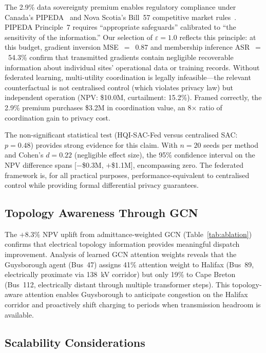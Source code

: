 \documentclass[journal]{IEEEtran}
\begin{document}
The 2.9\% data sovereignty premium enables regulatory compliance under
Canada's PIPEDA~\cite{pipeda2000} and Nova Scotia's Bill~57 competitive
market rules~\cite{nsbill57}. PIPEDA Principle~7 requires
``appropriate safeguards'' calibrated to ``the sensitivity of the
information.'' Our selection of $\varepsilon{=}1.0$ reflects this
principle: at this budget, gradient inversion MSE~$=$~0.87 and
membership inference ASR~$=$~54.3\% confirm that transmitted gradients
contain negligible recoverable information about individual sites'
operational data or training records. Without federated learning,
multi-utility coordination is legally infeasible---the relevant
counterfactual is not centralised control (which violates privacy law)
but independent operation (NPV: \$10.0M, curtailment: 15.2\%).
Framed correctly, the 2.9\% premium purchases \$3.2M in coordination
value, an 8$\times$ ratio of coordination gain to privacy cost.

The non-significant statistical test (HQI-SAC-Fed versus centralised
SAC: $p = 0.48$) provides strong evidence for this claim. With
$n = 20$ seeds per method and Cohen's $d = 0.22$ (negligible effect
size), the 95\% confidence interval on the NPV difference spans
[$-$\$0.3M, $+$\$1.1M], encompassing zero. The federated framework
is, for all practical purposes, performance-equivalent to centralised
control while providing formal differential privacy guarantees.

\subsection{Topology Awareness Through GCN}

The $+8.3\%$ NPV uplift from admittance-weighted GCN
(Table~\ref{tab:ablation}) confirms that electrical topology
information provides meaningful dispatch improvement. Analysis of
learned GCN attention weights reveals that the Guysborough agent
(Bus~47) assigns 41\% attention weight to Halifax (Bus~89, electrically
proximate via 138~kV corridor) but only 19\% to Cape Breton (Bus~112,
electrically distant through multiple transformer steps). This
topology-aware attention enables Guysborough to anticipate congestion
on the Halifax corridor and proactively shift charging to periods when
transmission headroom is available.

\subsection{Scalability Considerations}
\end{document}
